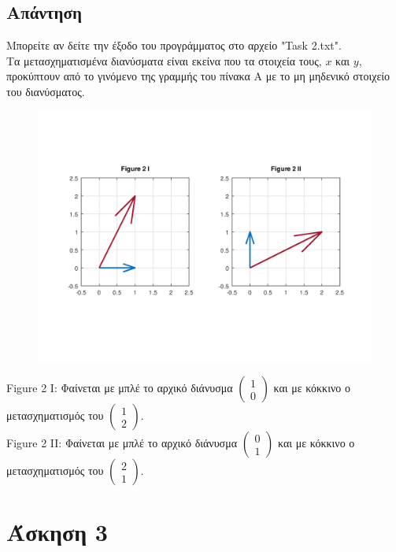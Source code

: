 \documentclass[a4paper,12pt]{article}
\begin{document}
\subsection{Απάντηση}
Μπορείτε αν δείτε την έξοδο του προγράμματος στο αρχείο "Task 2.txt".\\
Τα μετασχηματισμένα διανύσματα είναι εκείνα που τα στοιχεία τους, $x$ και $y$,
προκύπτουν από το γινόμενο της γραμμής του πίνακα Α με το μη μηδενικό στοιχείο
του διανύσματος.
\begin{center}
	\begin{figure}[H]
		\centering
		\includegraphics[scale=0.8]{2i_ii.png}
	\end{figure}
	Figure 2 I: Φαίνεται με μπλέ το αρχικό διάνυσμα $
		\begin{pmatrix}
			1 \\
			0
		\end{pmatrix}
	$ και με κόκκινο ο μετασχηματισμός του $
		\begin{pmatrix}
			1 \\
			2
		\end{pmatrix}
	$.\\
	Figure 2 II: Φαίνεται με μπλέ το αρχικό διάνυσμα $
		\begin{pmatrix}
			0 \\
			1
		\end{pmatrix}
	$ και με κόκκινο ο μετασχηματισμός του $
		\begin{pmatrix}
			2 \\
			1
		\end{pmatrix}
	$.
\end{center}
\newpage\section{Άσκηση 3}
\end{document}
